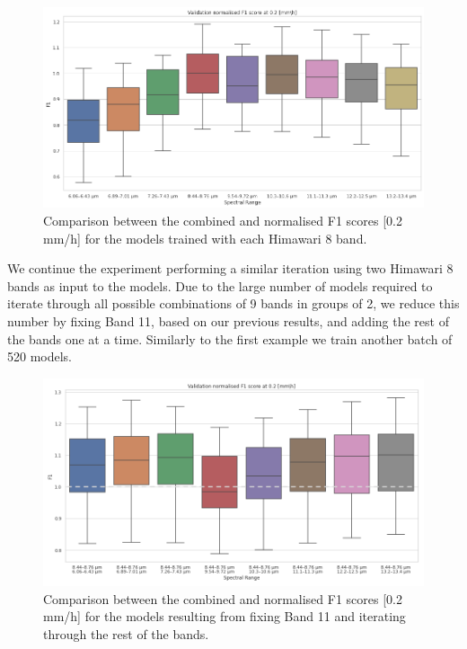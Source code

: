 \documentclass[3p,times]{elsarticle}
\begin{document}
\begin{figure}%
    \includegraphics[width=14cm]{figure2.png}
    \caption{Comparison between the combined and normalised F1 scores [0.2 mm/h] for the models trained with each Himawari 8 band.}%
    \label{experiment_1b}%
\end{figure}

We continue the experiment performing a similar iteration using two Himawari 8 bands as input to the models. Due to the large number of models required to iterate through all possible combinations of 9 bands in groups of 2, we reduce this number by fixing Band 11, based on our previous results, and adding the rest of the bands one at a time. Similarly to the first example we train another batch of 520 models.

\begin{figure}%
    \includegraphics[width=14cm]{figure3.png}
    \caption{Comparison between the combined and normalised F1 scores [0.2 mm/h] for the models resulting from fixing Band 11 and iterating through the rest of the bands.}%
    \label{experiment_2}%
\end{figure}
\end{document}
